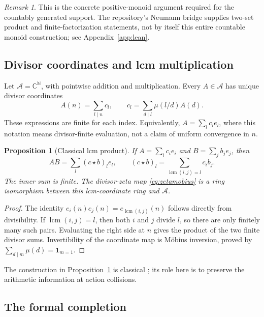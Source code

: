\documentclass[11pt,a4paper]{article}
\numberwithin{equation}{section}
\newtheorem{proposition}[theorem]{Proposition}
\theoremstyle{definition}
\theoremstyle{remark}
\newtheorem{remark}[theorem]{Remark}
\newcommand{\N}{\mathbb N}
\newcommand{\C}{\mathbb C}
\newcommand{\A}{\mathcal A}
\newcommand{\lcm}{\operatorname{lcm}}
\newcommand{\ind}{\mathbf 1}
\begin{document}
\begin{remark}
This is the concrete positive-monoid argument required for the countably
generated support. The repository's Neumann bridge supplies two-set
product and finite-factorization statements, not by itself this entire
countable monoid construction; see Appendix~\ref{app:lean}.
\end{remark}

\subsection{Divisor coordinates and lcm multiplication}

Let $\A=\C^{\N}$, with pointwise addition and multiplication. Every
$A\in\A$ has unique divisor coordinates
\begin{equation}
 A(n)=\sum_{l\mid n}c_l,\qquad
 c_l=\sum_{d\mid l}\mu(l/d)A(d).
 \label{eq:zetamobius}
\end{equation}
These expressions are finite for each index. Equivalently,
$A=\sum_l c_l e_l$, where this notation means divisor-finite evaluation,
not a claim of uniform convergence in $n$.

\begin{proposition}[Classical lcm product]\label{prop:lcm}
If $A=\sum_i c_i e_i$ and $B=\sum_j b_j e_j$, then
\begin{equation}
 AB=\sum_l(c\star b)_l e_l,
 \qquad (c\star b)_l=\sum_{\lcm(i,j)=l}c_i b_j.
 \label{eq:lcm}
\end{equation}
The inner sum is finite. The divisor-zeta map \eqref{eq:zetamobius}
is a ring isomorphism between this lcm-coordinate ring and $\A$.
\end{proposition}
\begin{proof}
The identity $e_i(n)e_j(n)=e_{\lcm(i,j)}(n)$ follows directly from
divisibility. If $\lcm(i,j)=l$, then both $i$ and $j$ divide $l$,
so there are only finitely many such pairs. Evaluating the right side
at $n$ gives the product of the two finite divisor sums. Invertibility
of the coordinate map is M\"obius inversion, proved by
$\sum_{d\mid m}\mu(d)=\ind_{m=1}$.
\end{proof}

The construction in Proposition~\ref{prop:lcm} is classical
\cite{toth}; its role here is to preserve the arithmetic information at
action collisions.

\subsection{The formal completion}
\end{document}
